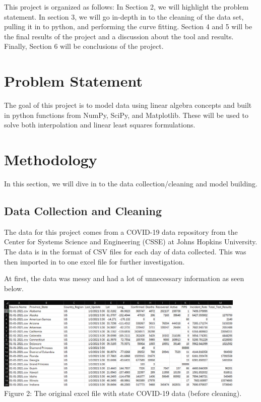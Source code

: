 \documentclass[12pt]{article}
\begin{document}
\noindent This project is organized as follows: In Section 2, we will highlight the problem statement. In section 3, we will go in-depth in to the cleaning of the data set, pulling it in to python, and performing the curve fitting. Section 4 and 5 will be the final results of the project and a discussion about the tool and results. Finally, Section 6 will be conclusions of the project.

\section{Problem Statement}
\noindent The goal of this project is to model data using linear algebra concepts and built in python functions from NumPy, SciPy, and Matplotlib. These will be used to solve both interpolation and linear least squares formulations. \\

\section{Methodology}
In this section, we will dive in to the data collection/cleaning and model building. 

\subsection{Data Collection and Cleaning}
The data for this project comes from a COVID-19 data repository from the Center for Systems Science and Engineering (CSSE) at Johns Hopkins University. The data is in the format of CSV files for each day of data collected. This was then imported in to one excel file for further investigation. \\

\pagebreak

\noindent At first, the data was messy and had a lot of unnecessary information as seen below. 

\begin{center}
\includegraphics[width = 0.9\textwidth]{Messy data.png} \\
Figure 2: The original excel file with state COVID-19 data (before cleaning).
\end{center}
\end{document}

